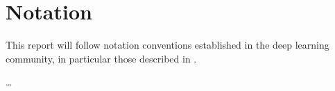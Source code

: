 \documentclass[../main.tex]{subfiles}
\begin{document}
\chapter*{Notation}

This report will follow notation conventions established in the deep learning community, in particular those described in \textcite{goodfellow2016}.


\dots{}
\end{document}
